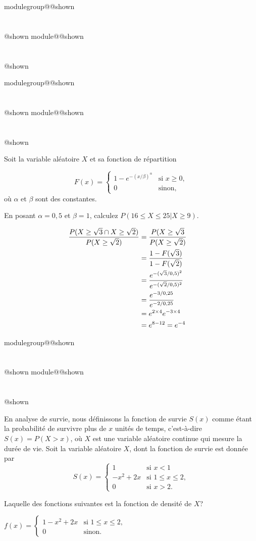 \documentclass{Evaluation}
\makeatletter
\newcommand{\currentmodulekey}{}
\newcommand{\currentmoduletitle}{}
\newcommand{\currentgroupkey}{}
\newcommand{\currentgrouptitle}{}
\newcommand{\showmoduleifneeded}{%
  \ifx\currentgroupkey\empty\else
    \expandafter\ifx\csname modulegroup@\currentgroupkey @shown\endcsname\relax
      \section*{\currentgrouptitle}%
      \expandafter\gdef\csname modulegroup@\currentgroupkey @shown\endcsname{1}%
    \fi
  \fi
  \expandafter\ifx\csname module@\currentmodulekey @shown\endcsname\relax
    \section*{\currentmoduletitle}%
    \expandafter\gdef\csname module@\currentmodulekey @shown\endcsname{1}%
  \fi
}
\newenvironment{A22}{\showmoduleifneeded}{}
\newenvironment{A24}{\showmoduleifneeded}{}
\newenvironment{H25}{\showmoduleifneeded}{}
\makeatother
\begin{document}
\begin{questions}
\begin{A22}
\begin{parts}
\end{parts}

\end{A22}

\begin{H25}
\question {} %
Soit la variable aléatoire $X$ et sa fonction de répartition

\[ F(x) =
\begin{cases}
   \displaystyle 1-e^{-(x/\beta)^\alpha}& \text{si } x \ge 0, \\
    0 & \text{sinon},
\end{cases}
\]
où $\alpha$ et $\beta$ sont des constantes.

En posant $\alpha = 0,5$ et $\beta=1$, calculez $P(16 \leq X \leq 25 | X\geq 9)$.

\begin{solution}
    \begin{align*}
        \frac{P(X \geq \sqrt{3} \cap X \geq \sqrt{2})}{P(X \geq \sqrt{2})}
        &= \frac{P(X \geq \sqrt{3} }{P(X \geq \sqrt{2})} \cr
        &=\frac{1-F(\sqrt{3})}{1-F(\sqrt{2})} \cr
        &=\frac{e^{-(\sqrt{3}/0,5)^2}}{e^{-(\sqrt{2}/0,5)^2}}\cr
        &= \frac{e^{-3/0,25}}{e^{-2/0,25}} \cr
        &= e^{2 \times 4}e^{-3\times 4} \cr
        &= e^{8-12} = e^{-4}
    \end{align*}
\end{solution}
\end{H25}

\begin{A24}
\question {} %
En analyse de survie, nous définissons la fonction de survie $S(x)$ comme étant la probabilité de survivre plus de $x$ unités de temps, c'est-à-dire $S(x)=P(X>x)$, où $X$ est une variable aléatoire continue qui mesure la durée de vie.  Soit la variable aléatoire $X$, dont la fonction de survie est donnée par
\[ S(x) =
\begin{cases}
1 & \text{si } x<1\\
   \displaystyle -x^2+2x& \text{si } 1\leq x\leq 2, \\
    0 & \text{si } x>2.
\end{cases}
\]

Laquelle des fonctions suivantes est la fonction de densité de $X$?

\begin{checkboxes}
\choice $f(x)=\left\{
			\begin{array}{ll}
   \displaystyle 1-x^2+2x& \text{si } 1\leq x\leq 2, \\
			0 & \mbox{sinon.}
			\end{array}
			\right. $


\end{checkboxes}
\end{A24}
\end{questions}
\end{document}
